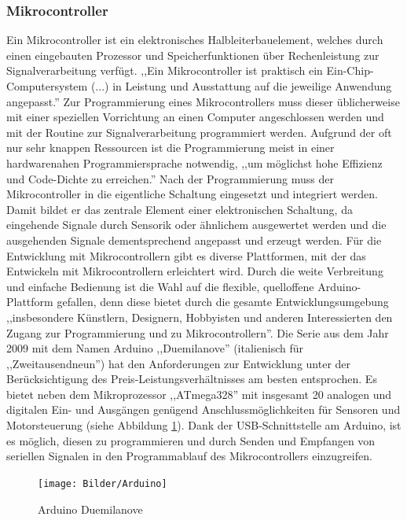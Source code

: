 \documentclass[a4paper, 12pt, bibtotocnumbered, liststotocnumbered]{scrartcl}
\begin{document}
	\subsubsection{Mikrocontroller}
	Ein Mikrocontroller ist ein elektronisches Halbleiterbauelement, welches durch einen eingebauten Prozessor und Speicherfunktionen über Rechenleistung zur Signalverarbeitung verfügt. ,,Ein Mikrocontroller ist praktisch ein Ein-Chip-Computersystem (...) in Leistung und Ausstattung auf die jeweilige Anwendung angepasst.”\cite{wikipedia-mikrocontroller}
	Zur Programmierung eines Mikrocontrollers muss dieser üblicherweise mit einer speziellen Vorrichtung an einen Computer angeschlossen werden und mit der Routine zur Signalverarbeitung programmiert werden. Aufgrund der oft nur sehr knappen Ressourcen ist die Programmierung meist in einer hardwarenahen Programmiersprache notwendig, ,,um möglichst hohe Effizienz und Code-Dichte zu erreichen.”\cite{wikipedia-mikrocontroller} Nach der Programmierung muss der Mikrocontroller in die eigentliche Schaltung eingesetzt und integriert werden. Damit bildet er das zentrale Element einer elektronischen Schaltung, da eingehende Signale durch Sensorik oder ähnlichem ausgewertet werden und die ausgehenden Signale dementsprechend angepasst und erzeugt werden.
	Für die Entwicklung mit Mikrocontrollern gibt es diverse Plattformen, mit der das Entwickeln mit Mikrocontrollern erleichtert wird. Durch die weite Verbreitung und einfache Bedienung ist die Wahl auf die flexible, quelloffene Arduino-Plattform gefallen, denn diese bietet durch die gesamte Entwicklungsumgebung ,,insbesondere Künstlern, Designern, Hobbyisten und anderen Interessierten den Zugang zur Programmierung und zu Mikrocontrollern”\cite{wikipedia-arduino}.
	Die Serie aus dem Jahr 2009 mit dem Namen Arduino ,,Duemilanove” (italienisch für ,,Zweitausendneun”) hat den Anforderungen zur Entwicklung unter der Berücksichtigung des Preis-Leistungsverhältnisses am besten entsprochen. Es bietet neben dem Mikroprozessor ,,ATmega328” mit insgesamt 20 analogen und digitalen Ein- und Ausgängen genügend Anschlussmöglichkeiten für Sensoren und Motorsteuerung (siehe Abbildung \ref{Arduino}).
	Dank der USB-Schnittstelle am Arduino, ist es möglich, diesen zu programmieren und durch Senden und Empfangen von seriellen Signalen in den Programmablauf des Mikrocontrollers einzugreifen.

	\begin{figure}[htb]
		\centering
		\texttt{[image: Bilder/Arduino]}
		\caption{Arduino Duemilanove}
		\label{Arduino}
	\end{figure}
\end{document}
